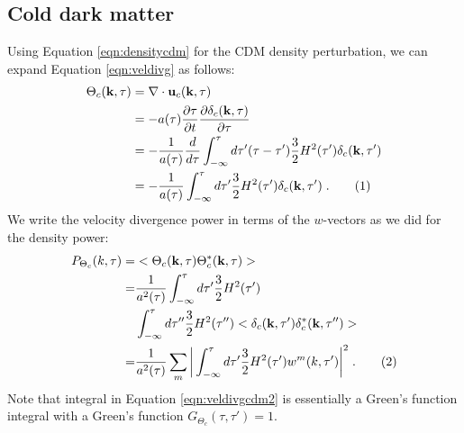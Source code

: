 \documentclass[twocolumn,superscriptaddress,prd]{revtex4}
\newcommand\numberthis{\addtocounter{equation}{1}\tag{\theequation}}
\begin{document}
\subsection{ Cold dark matter }\label{sec:velcdm}

Using Equation \eqref{eqn:densitycdm} for the CDM density perturbation, we can expand
Equation \eqref{eqn:veldivg} as follows:
\begin{align*}\label{eqn:veldivgcdm}
  \Theta_c(\mathbf{k}, \tau) & = \nabla \cdot
                                   \mathbf{u}_c(\mathbf{k},\tau) \\
&=-a(\tau) \frac{ \partial \tau }{ \partial t }
                                \frac{ \partial \delta_c (\mathbf{k},\tau)}{\partial
                                \tau} \\
  &= -\frac{1}{a(\tau)} \frac{d}{d\tau} \int_{-\infty}^{\tau} d\tau' (\tau
      - \tau') \frac{3}{2} H^2(\tau') \delta_c(\mathbf{k},\tau') \\
 &= - \frac{1}{a(\tau)} \int_{-\infty}^{\tau} d\tau' \frac{3}{2} H^2(\tau')
     \delta_c(\mathbf{k},\tau')\;. \numberthis
\end{align*} 
We write the velocity divergence power in terms of the $w$-vectors as we did for the density power:
\begin{align*} \label{eqn:veldivgcdm2}
  P_{\Theta_c}( k,\tau ) =& < \Theta_c(\mathbf{k},\tau) \Theta_c^*(\mathbf{k},\tau)>  \\
  =& \frac{1}{a^2(\tau)} \int_{-\infty}^{\tau} d\tau' \frac{3}{2}
      H^2(\tau')\\
& \int_{-\infty}^{\tau} d\tau'' \frac{3}{2} H^2(\tau'')
      < \delta_c(\mathbf{k},\tau') \delta_c^*(\mathbf{k},\tau'') >\\
  =& \frac{1}{a^2(\tau)} \sum_{m} \bigg| \int_{-\infty}^{\tau} d\tau'
      \frac{3}{2} H^2(\tau') w^m(k, \tau') \bigg|^2\;. \numberthis
\end{align*}
Note that integral in Equation
\eqref{eqn:veldivgcdm2} is essentially a Green's function integral with
a Green's function $G_{\Theta_c}(\tau, \tau' ) = 1$. 

\end{document}
